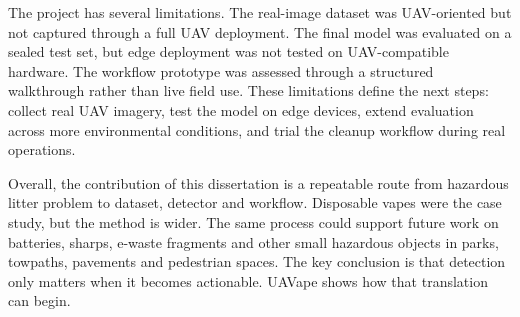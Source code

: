 The project has several limitations. The real-image dataset was UAV-oriented but not captured through a full UAV deployment. The final model was evaluated on a sealed test set, but edge deployment was not tested on UAV-compatible hardware. The workflow prototype was assessed through a structured walkthrough rather than live field use. These limitations define the next steps: collect real UAV imagery, test the model on edge devices, extend evaluation across more environmental conditions, and trial the cleanup workflow during real operations.

Overall, the contribution of this dissertation is a repeatable route from hazardous litter problem to dataset, detector and workflow. Disposable vapes were the case study, but the method is wider. The same process could support future work on batteries, sharps, e-waste fragments and other small hazardous objects in parks, towpaths, pavements and pedestrian spaces. The key conclusion is that detection only matters when it becomes actionable. UAVape shows how that translation can begin.

